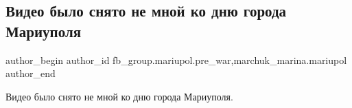  
 
 
 
 

\subsection{Видео было снято не мной ко дню города Мариуполя}
\label{sec:24_02_2023.fb.fb_group.mariupol.pre_war.2.video_bilo_snyato_ne}
 
\ifcmt
 author_begin
   author_id fb_group.mariupol.pre_war,marchuk_marina.mariupol
 author_end
\fi

Видео было снято не мной ко дню города Мариуполя.
